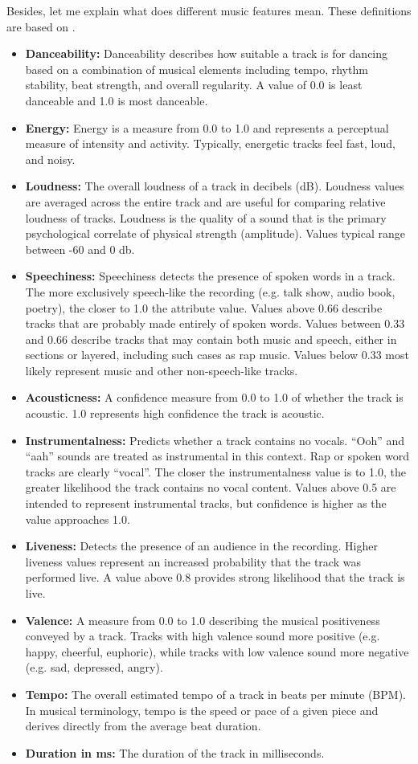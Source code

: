 \documentclass[12pt]{article}
\theoremstyle{plain}
\theoremstyle{definition}
\theoremstyle{remark}
\begin{document}
Besides, let me explain what does different music features mean. These definitions are based on \cite{2.3}.
\begin{itemize}
    \item \textbf{Danceability:} Danceability describes how suitable a track is for dancing based on a combination of musical elements including tempo, rhythm stability, beat strength, and overall regularity. A value of 0.0 is least danceable and 1.0 is most danceable.
    \item \textbf{Energy:} Energy is a measure from 0.0 to 1.0 and represents a perceptual measure of intensity and activity. Typically, energetic tracks feel fast, loud, and noisy. 
    \item \textbf{Loudness:} The overall loudness of a track in decibels (dB). Loudness values are averaged across the entire track and are useful for comparing relative loudness of tracks. Loudness is the quality of a sound that is the primary psychological correlate of physical strength (amplitude). Values typical range between -60 and 0 db.
    \item \textbf{Speechiness:} Speechiness detects the presence of spoken words in a track. The more exclusively speech-like the recording (e.g. talk show, audio book, poetry), the closer to 1.0 the attribute value. Values above 0.66 describe tracks that are probably made entirely of spoken words. Values between 0.33 and 0.66 describe tracks that may contain both music and speech, either in sections or layered, including such cases as rap music. Values below 0.33 most likely represent music and other non-speech-like tracks.
    \item \textbf{Acousticness:} A confidence measure from 0.0 to 1.0 of whether the track is acoustic. 1.0 represents high confidence the track is acoustic.
    \item \textbf{Instrumentalness:} Predicts whether a track contains no vocals. “Ooh” and “aah” sounds are treated as instrumental in this context. Rap or spoken word tracks are clearly “vocal”. The closer the instrumentalness value is to 1.0, the greater likelihood the track contains no vocal content. Values above 0.5 are intended to represent instrumental tracks, but confidence is higher as the value approaches 1.0.
    \item \textbf{Liveness:} Detects the presence of an audience in the recording. Higher liveness values represent an increased probability that the track was performed live. A value above 0.8 provides strong likelihood that the track is live.
    \item \textbf{Valence:} A measure from 0.0 to 1.0 describing the musical positiveness conveyed by a track. Tracks with high valence sound more positive (e.g. happy, cheerful, euphoric), while tracks with low valence sound more negative (e.g. sad, depressed, angry).
    \item \textbf{Tempo:} The overall estimated tempo of a track in beats per minute (BPM). In musical terminology, tempo is the speed or pace of a given piece and derives directly from the average beat duration.
    \item \textbf{Duration in ms:} The duration of the track in milliseconds.
\end{itemize}
\end{document}
